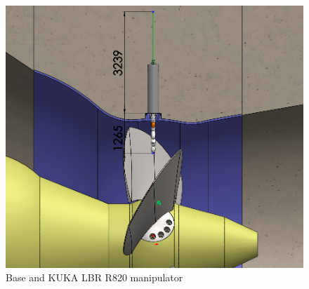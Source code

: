 

\begin{figure}[h!]
\centering
	\includegraphics[width=\columnwidth]{figs/estudo/solid/Base_Ambiente3d_Recolhida.png} 
	\caption{Base and KUKA LBR R820 manipulator}
	\label{fig::base_ambiente3d_recolhida}
\end{figure}

%


